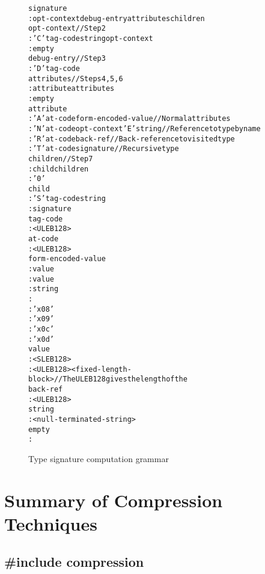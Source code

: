 \begin{figure}[h]
\begin{dwflisting}
\begin{alltt}
signature
    : opt-context debug-entry attributes children
opt-context               // Step 2
    : 'C' tag-code string opt-context
    : empty
debug-entry               // Step 3
    : 'D' tag-code
attributes                // Steps 4, 5, 6
    : attribute attributes
    : empty
attribute
    : 'A' at-code form-encoded-value     // Normal attributes
    : 'N' at-code opt-context 'E' string // Reference to type by name
    : 'R' at-code back-ref               // Back-reference to visited type
    : 'T' at-code signature              // Recursive type
children                 //  Step 7
    : child children
    : '0'
child
    : 'S' tag-code string
    : signature
tag-code
    : <ULEB128>
at-code
    : <ULEB128>
form-encoded-value
    :  value 
    :  value 
    :  string 
    :   
 
    : 'x08'
  
    : 'x09'
 
    : 'x0c'
 
    : 'x0d'
value
    : <SLEB128>
    : <ULEB128> <fixed-length-block> // The ULEB128 gives the length of the 
back-ref
    : <ULEB128>
string
    : <null-terminated-string>
empty
    :
\end{alltt}
\end{dwflisting}
\caption{Type signature computation grammar}
\label{fig:typesignaturecomputationgrammar}
\end{figure}

\section{Summary of Compression Techniques}
\label{app:summaryofcompressiontechniques}
\subsection{\#include compression}
\label{app:includecompression}

